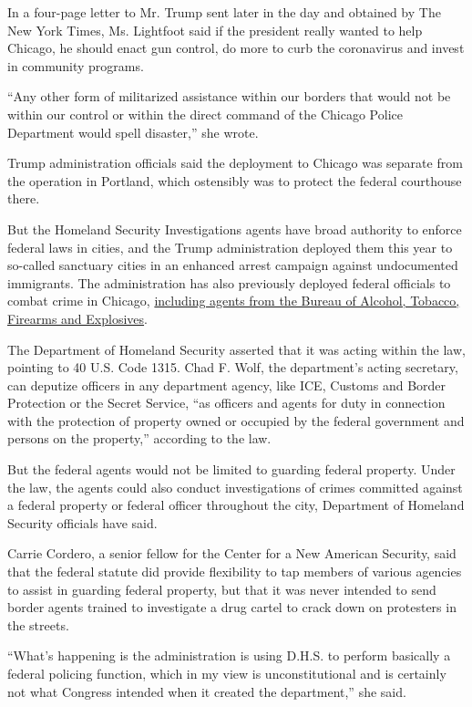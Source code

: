 In a four-page letter to Mr. Trump sent later in the day and obtained by
The New York Times, Ms. Lightfoot said if the president really wanted to
help Chicago, he should enact gun control, do more to curb the
coronavirus and invest in community programs.

``Any other form of militarized assistance within our borders that would
not be within our control or within the direct command of the Chicago
Police Department would spell disaster,'' she wrote.

Trump administration officials said the deployment to Chicago was
separate from the operation in Portland, which ostensibly was to protect
the federal courthouse there.

But the Homeland Security Investigations agents have broad authority to
enforce federal laws in cities, and the Trump administration deployed
them this year to so-called sanctuary cities in an enhanced arrest
campaign against undocumented immigrants. The administration has also
previously deployed federal officials to combat crime in Chicago,
\href{https://www.nytimes3xbfgragh.onion/2017/06/30/us/chicago-guns-violence-atf-police.html}{including
agents from the Bureau of Alcohol, Tobacco, Firearms and Explosives}.

The Department of Homeland Security asserted that it was acting within
the law, pointing to 40 U.S. Code 1315. Chad F. Wolf, the department's
acting secretary, can deputize officers in any department agency, like
ICE, Customs and Border Protection or the Secret Service, ``as officers
and agents for duty in connection with the protection of property owned
or occupied by the federal government and persons on the property,''
according to the law.

But the federal agents would not be limited to guarding federal
property. Under the law, the agents could also conduct investigations of
crimes committed against a federal property or federal officer
throughout the city, Department of Homeland Security officials have
said.

Carrie Cordero, a senior fellow for the Center for a New American
Security, said that the federal statute did provide flexibility to tap
members of various agencies to assist in guarding federal property, but
that it was never intended to send border agents trained to investigate
a drug cartel to crack down on protesters in the streets.

``What's happening is the administration is using D.H.S. to perform
basically a federal policing function, which in my view is
unconstitutional and is certainly not what Congress intended when it
created the department,'' she said.

